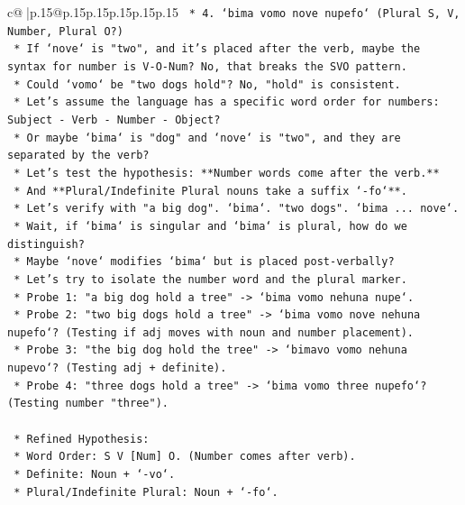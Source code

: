 \documentclass{article}
\begin{document}
{\begin{supertabular}{c@{$\;$}|p{.15\linewidth}@{}p{.15\linewidth}p{.15\linewidth}p{.15\linewidth}p{.15\linewidth}p{.15\linewidth}}
{{{\texttt{        *   4. `bima vomo nove nupefo` (Plural S, V, Number, Plural O?)} \\
\texttt{        *   If `nove` is "two", and it's placed after the verb, maybe the syntax for number is V{-}O{-}Num? No, that breaks the SVO pattern.} \\
\texttt{        *   Could `vomo` be "two dogs hold"? No, "hold" is consistent.} \\
\texttt{        *   Let's assume the language has a specific word order for numbers: Subject {-} Verb {-} Number {-} Object?} \\
\texttt{        *   Or maybe `bima` is "dog" and `nove` is "two", and they are separated by the verb?} \\
\texttt{        *   Let's test the hypothesis: **Number words come after the verb.**} \\
\texttt{        *   And **Plural/Indefinite Plural nouns take a suffix `{-}fo`**.} \\
\texttt{        *   Let's verify with "a big dog". `bima`. "two dogs". `bima ... nove`.} \\
\texttt{        *   Wait, if `bima` is singular and `bima` is plural, how do we distinguish?} \\
\texttt{        *   Maybe `nove` modifies `bima` but is placed post{-}verbally?} \\
\texttt{        *   Let's try to isolate the number word and the plural marker.} \\
\texttt{        *   Probe 1: "a big dog hold a tree" {-}> `bima vomo nehuna nupe`.} \\
\texttt{        *   Probe 2: "two big dogs hold a tree" {-}> `bima vomo nove nehuna nupefo`? (Testing if adj moves with noun and number placement).} \\
\texttt{        *   Probe 3: "the big dog hold the tree" {-}> `bimavo vomo nehuna nupevo`? (Testing adj + definite).} \\
\texttt{        *   Probe 4: "three dogs hold a tree" {-}> `bima vomo three nupefo`? (Testing number "three").} \\
\\ 
\texttt{    *   Refined Hypothesis:} \\
\texttt{        *   Word Order: S V {[}Num{]} O. (Number comes after verb).} \\
\texttt{        *   Definite: Noun + `{-}vo`.} \\
\texttt{        *   Plural/Indefinite Plural: Noun + `{-}fo`.} \\
}}}
\end{supertabular}}
\end{document}
